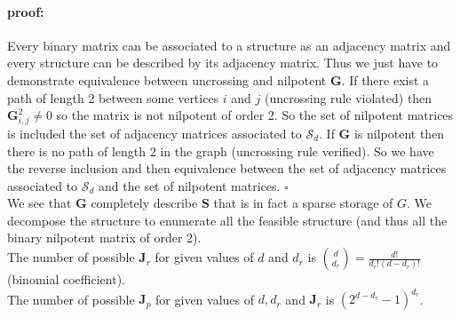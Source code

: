 \documentclass[12pt,a4paper]{report}
\begin{document}
	\paragraph{proof:} Every binary matrix can be associated to a structure as an adjacency matrix and every structure can be described by its adjacency matrix. Thus we just have to demonstrate equivalence between uncrossing and nilpotent $\boldsymbol{G}$. If there exist a path of length 2 between some vertices $i$ and $j$ (uncrossing rule violated) then $\boldsymbol{G}^2_{i,j}\neq 0$ so the matrix is not nilpotent of order 2. So the set of nilpotent matrices is included the set of adjacency matrices associated to $\mathcal{S}_d$. If $\boldsymbol{G}$ is nilpotent then there is no path of length 2 in the graph (uncrossing rule verified). So we have the reverse inclusion and then equivalence between the set of adjacency matrices associated to $\mathcal{S}_d$ and the set of nilpotent matrices. $\square$\\
	
	We see that $\boldsymbol{G}$ completely describe $\boldsymbol{S}$ that is in fact a sparse storage of $G$.
	We decompose the structure to enumerate all the feasible structure (and thus all the binary nilpotent matrix of order 2).\\
	
	

			The number of possible $\boldsymbol{J}_r$ for given values of $d$ and $d_r$ is ${d \choose d_r}=\frac{d!}{d_r!(d-d_r)!}$ (binomial coefficient).\\
	
			The number of possible $\boldsymbol{J}_p$ for given values of $d, d_r$ and $\boldsymbol{J}_r$ is $(2^{d-d_r}-1)^{d_r}$.\\
			
\end{document}
